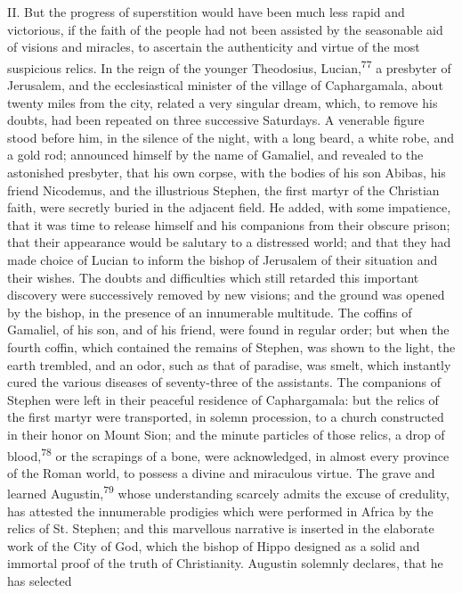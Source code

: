 II. But the progress of superstition would have been much less
rapid and victorious, if the faith of the people had not been
assisted by the seasonable aid of visions and miracles, to
ascertain the authenticity and virtue of the most suspicious
relics. In the reign of the younger Theodosius, Lucian,\textsuperscript{77} a
presbyter of Jerusalem, and the ecclesiastical minister of the
village of Caphargamala, about twenty miles from the city,
related a very singular dream, which, to remove his doubts, had
been repeated on three successive Saturdays. A venerable figure
stood before him, in the silence of the night, with a long beard,
a white robe, and a gold rod; announced himself by the name of
Gamaliel, and revealed to the astonished presbyter, that his own
corpse, with the bodies of his son Abibas, his friend Nicodemus,
and the illustrious Stephen, the first martyr of the Christian
faith, were secretly buried in the adjacent field. He added, with
some impatience, that it was time to release himself and his
companions from their obscure prison; that their appearance would
be salutary to a distressed world; and that they had made choice
of Lucian to inform the bishop of Jerusalem of their situation
and their wishes. The doubts and difficulties which still
retarded this important discovery were successively removed by
new visions; and the ground was opened by the bishop, in the
presence of an innumerable multitude. The coffins of Gamaliel, of
his son, and of his friend, were found in regular order; but when
the fourth coffin, which contained the remains of Stephen, was
shown to the light, the earth trembled, and an odor, such as that
of paradise, was smelt, which instantly cured the various
diseases of seventy-three of the assistants. The companions of
Stephen were left in their peaceful residence of Caphargamala:
but the relics of the first martyr were transported, in solemn
procession, to a church constructed in their honor on Mount Sion;
and the minute particles of those relics, a drop of blood,\textsuperscript{78} or
the scrapings of a bone, were acknowledged, in almost every
province of the Roman world, to possess a divine and miraculous
virtue. The grave and learned Augustin,\textsuperscript{79} whose understanding
scarcely admits the excuse of credulity, has attested the
innumerable prodigies which were performed in Africa by the
relics of St. Stephen; and this marvellous narrative is inserted
in the elaborate work of the City of God, which the bishop of
Hippo designed as a solid and immortal proof of the truth of
Christianity. Augustin solemnly declares, that he has selected
